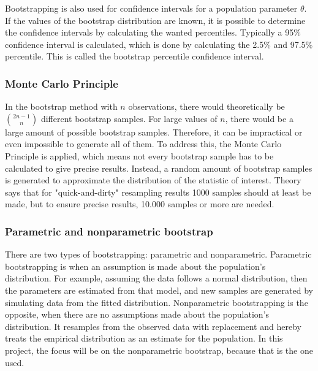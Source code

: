 Bootstrapping is also used for confidence intervals for a population parameter $\theta$. If the values of the bootstrap distribution are known, it is possible to determine the confidence intervals by calculating the wanted percentiles. Typically a 95\% confidence interval is calculated, which is done by calculating the 2.5\% and 97.5\% percentile. This is called the bootstrap percentile confidence interval.

\subsubsection{Monte Carlo Principle}
In the bootstrap method with $n$ observations, there would theoretically be $\binom{2n-1}{n}$ different bootstrap samples. For large values of $n$, there would be a large amount of possible bootstrap samples. Therefore, it can be impractical or even impossible to generate all of them. To address this, the Monte Carlo Principle is applied, which means not every bootstrap sample has to be calculated to give precise results. Instead, a random amount of bootstrap samples is generated to approximate the distribution of the statistic of interest. Theory says that for "quick-and-dirty" resampling results 1000 samples should at least be made, but to ensure precise results, 10.000 samples or more are needed.

\subsubsection{Parametric and nonparametric bootstrap}
There are two types of bootstrapping: parametric and nonparametric. Parametric bootstrapping is when an assumption is made about the population's distribution. For example, assuming the data follows a normal distribution, then the parameters are estimated from that model, and new samples are generated by simulating data from the fitted distribution. Nonparametric bootstrapping is the opposite, when there are no assumptions made about the population's distribution. It resamples from the observed data with replacement and hereby treats the empirical distribution as an estimate for the population. In this project, the focus will be on the nonparametric bootstrap, because that is the one used. \newline

